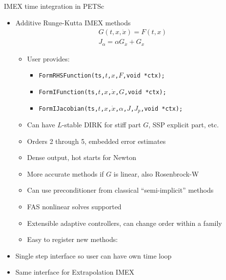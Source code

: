 \begin{frame}{IMEX time integration in PETSc}
  \begin{itemize}
  \item Additive Runge-Kutta IMEX methods
    \begin{gather*}
      G(t,x,\dot x) = F(t,x) \\
      J_\alpha = \alpha G_{\dot x} + G_x
    \end{gather*}
    \vspace{-1em}
    \begin{itemize}
    \item User provides:
      \begin{itemize}
      \item \texttt{FormRHSFunction(ts,$t$,$x$,$F$,void *ctx);}
      \item \texttt{FormIFunction(ts,$t$,$x$,$\dot x$,$G$,void *ctx);}
      \item \texttt{FormIJacobian(ts,$t$,$x$,$\dot x$,$\alpha$,$J$,$J_{p}$,void *ctx);}
      \end{itemize}
    \item Can have $L$-stable DIRK for stiff part $G$, SSP explicit part, etc.
    \item Orders 2 through 5, embedded error estimates
    \item Dense output, hot starts for Newton
    \item More accurate methods if $G$ is linear, also Rosenbrock-W
    \item Can use preconditioner from classical ``semi-implicit'' methods
    \item FAS nonlinear solves supported
    \item Extensible adaptive controllers, can change order within a family
    \item Easy to register new methods: 
    \end{itemize}
  \item Single step interface so user can have own time loop
  \item Same interface for Extrapolation IMEX
  \end{itemize}
\end{frame}
